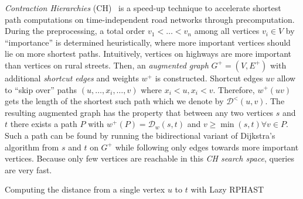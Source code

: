 \documentclass[a4paper,UKenglish,cleveref, autoref, thm-restate,anonymous]{lipics-v2021}
\newcommand*{\dist}{\mathcal{D}}
\newcommand*{\gchu}{G^{\uparrow}}
\begin{document}
\emph{Contraction Hierarchies} (CH)~\cite{gssv-erlrn-12} is a speed-up technique to accelerate shortest path computations on time-independent road networks through precomputation.
During the preprocessing, a total order $v_1 < \dots < v_n$ among all vertices $v_i \in V$ by ``importance'' is determined heuristically, where more important vertices should lie on more shortest paths.
Intuitively, vertices on highways are more important than vertices on rural streets.
Then, an \emph{augmented graph} $G^+ = (V, E^+)$ with additional \emph{shortcut edges} and weights $w^+$ is constructed.
Shortcut edges $uv$ allow to ``skip over'' paths $(u,\dots,x_i,\dots,v)$ where $x_i < u, x_i < v$.
Therefore, $w^+(uv)$ gets the length of the shortest such path which we denote by $\dist^<(u,v)$.
The resulting augmented graph has the property that between any two vertices $s$ and $t$ there exists a path $P$ with $w^+(P) = \dist_w(s,t)$ and $v \geq \min(s, t) \forall v \in P$.
Such a path can be found by running the bidirectional variant of Dijkstra's algorithm from $s$ and $t$ on $G^+$ while following only edges towards more important vertices.
Because only few vertices are reachable in this \emph{CH search space}, queries are very fast.





\begin{algorithm2e}
\caption{Computing the distance from a single vertex $u$ to $t$ with Lazy RPHAST}
\label{algo:lazy_rphast}
\end{algorithm2e}
\end{document}
